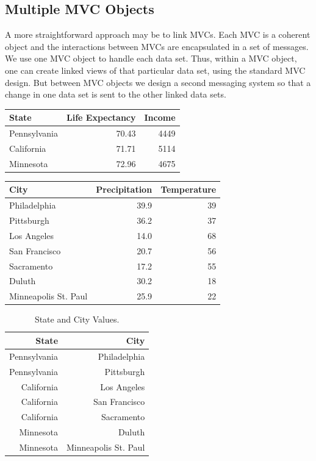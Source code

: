 \documentclass{article}[11pt]
\begin{document}
\subsection{Multiple MVC Objects}\label{Ssec:MMVC}

A more straightforward approach may be to link MVCs.  Each MVC is a coherent
object and the interactions between MVCs are encapsulated in a set of
messages.  We use one MVC object to handle each data set.  Thus, within a MVC
object, one can create linked views of that particular data set, using the
standard MVC design.  But between MVC objects we design a second messaging
system so that a change in one data set is sent to the other linked data sets. 

\small
\begin{tabular}[t]{ | l | r | r | }
  \hline
  State & Life Expectancy & Income \\ \hline
  Pennsylvania & 70.43 & 4449 \\ \hline
  California & 71.71 & 5114 \\ \hline
  Minnesota & 72.96 & 4675 \\ \hline
\end{tabular}
\hspace{10pt}
\begin{tabular}[t]{ | l | r | r | }
  \hline
  City & Precipitation & Temperature \\ \hline
  Philadelphia & 39.9 & 39 \\ \hline
  Pittsburgh & 36.2 & 37 \\ \hline
  Los Angeles & 14.0 & 68 \\ \hline
  San Francisco & 20.7 & 56 \\ \hline
  Sacramento & 17.2 & 55 \\ \hline
  Duluth & 30.2 & 18 \\ \hline
  Minneapolis St. Paul & 25.9 & 22 \\ \hline
\end{tabular}

\begin{table}[h]
  \begin{center}
    \begin{tabular}{ | r | r | }
      \hline
      State & City \\ \hline
      Pennsylvania & Philadelphia \\ \hline
      Pennsylvania & Pittsburgh \\ \hline
      California & Los Angeles \\ \hline
      California & San Francisco \\ \hline
      California & Sacramento \\ \hline
      Minnesota & Duluth \\ \hline
      Minnesota & Minneapolis St. Paul \\ \hline
    \end{tabular}
    \caption{State and City Values.}\label{Tab:CityState}
  \end{center}
\end{table}
\end{document}
